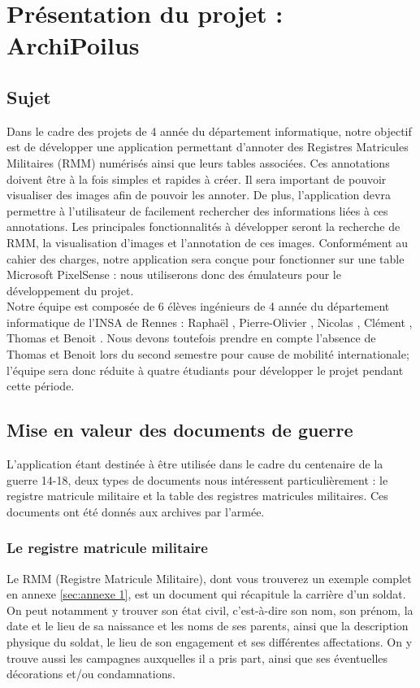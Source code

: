 \documentclass[a4paper]{article}
\begin{document}
\newpage

\section{Présentation du projet : ArchiPoilus}

\subsection{Sujet}

	Dans le cadre des projets de 4 année du département informatique, notre objectif est de développer une application permettant d’annoter des Registres Matricules Militaires (RMM) numérisés ainsi que leurs tables associées. Ces annotations doivent être à la fois simples et rapides à créer. Il sera important de pouvoir visualiser des images afin de pouvoir les annoter. De plus, l’application devra permettre à l’utilisateur de facilement rechercher des informations liées à ces annotations. Les principales fonctionnalités à développer seront la recherche de RMM, la visualisation d’images et l’annotation de ces images. Conformément au cahier des charges, notre application sera conçue pour fonctionner sur une table Microsoft PixelSense : nous utiliserons donc des émulateurs pour le développement du projet.\\
	
	Notre équipe est composée de 6 élèves ingénieurs de 4 année du département informatique de l’INSA de Rennes : Raphaël , Pierre-Olivier , Nicolas , Clément , Thomas  et Benoit . Nous devons toutefois prendre en compte l’absence de Thomas et Benoit lors du second semestre pour cause de mobilité internationale; l’équipe sera donc réduite à quatre étudiants pour développer le projet pendant cette période.

\subsection{Mise en valeur des documents de guerre}

	L'application étant destinée à être utilisée dans le cadre du centenaire de la guerre 14-18, deux types de documents nous intéressent particulièrement : le registre matricule militaire et la table des registres matricules militaires. Ces documents ont été donnés aux archives par l'armée.

\subsubsection{Le registre matricule militaire}
	Le RMM (Registre Matricule Militaire), dont vous trouverez un exemple complet en annexe \ref{sec:annexe 1}, est un document qui récapitule la carrière d'un soldat. On peut notamment y trouver son état civil, c'est-à-dire son nom, son prénom, la date et le lieu de sa naissance et les noms de ses parents, ainsi que la description physique du soldat, le lieu de son engagement et ses différentes affectations. On y trouve aussi les campagnes auxquelles il a pris part, ainsi que ses éventuelles décorations et/ou condamnations.\\
\end{document}
